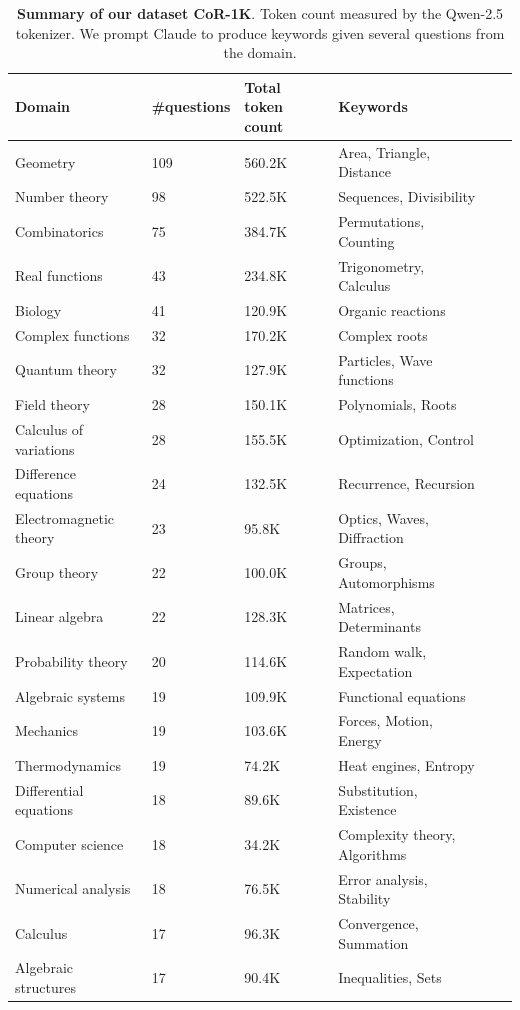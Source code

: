 \documentclass{article}
\theoremstyle{plain}
\theoremstyle{definition}
\theoremstyle{remark}
\newcommand{\data}{\textbf{CoR-1K}}
\begin{document}
\begin{table}[htbp]
\centering
\caption{\textbf{Summary of our dataset \data{}}. Token count measured by the Qwen-2.5 tokenizer. We prompt Claude to produce keywords given several questions from the domain.}
\begin{tabular}{>{\raggedright}p{3.5cm} l l l l l}
\toprule
Domain & \#questions & Total token count & Keywords \\
\midrule
Geometry & 109 & 560.2K & Area, Triangle, Distance \\
Number theory & 98 & 522.5K & Sequences, Divisibility \\
Combinatorics & 75 & 384.7K & Permutations, Counting \\
Real functions & 43 & 234.8K & Trigonometry, Calculus  \\
Biology & 41 & 120.9K & Organic reactions \\
Complex functions & 32 & 170.2K & Complex roots \\
Quantum theory & 32 & 127.9K & Particles, Wave functions \\
Field theory & 28 & 150.1K & Polynomials, Roots \\
Calculus of variations & 28 & 155.5K & Optimization, Control \\
Difference equations & 24 & 132.5K & Recurrence, Recursion \\
Electromagnetic theory & 23 & 95.8K & Optics, Waves, Diffraction \\
Group theory & 22 & 100.0K & Groups, Automorphisms \\
Linear algebra & 22 & 128.3K & Matrices, Determinants \\
Probability theory & 20 & 114.6K & Random walk, Expectation \\
Algebraic systems & 19 & 109.9K & Functional equations \\
Mechanics & 19 & 103.6K & Forces, Motion, Energy \\
Thermodynamics & 19 & 74.2K &  Heat engines, Entropy \\
Differential equations & 18 & 89.6K & Substitution, Existence \\
Computer science & 18 & 34.2K & Complexity theory, Algorithms \\
Numerical analysis & 18 & 76.5K & Error analysis, Stability \\
Calculus & 17 & 96.3K & Convergence, Summation \\
Algebraic structures & 17 & 90.4K & Inequalities, Sets \\

\end{tabular}
\end{table}
\end{document}
